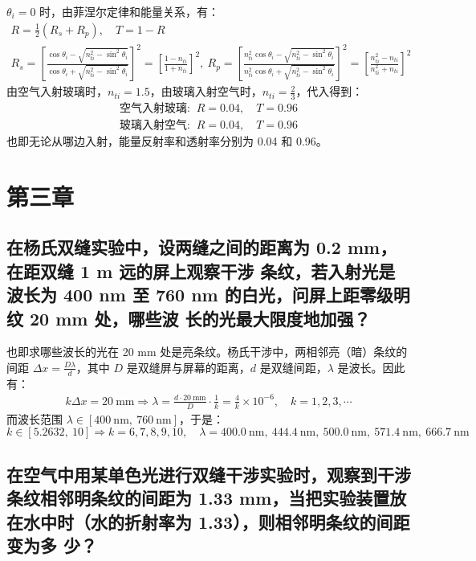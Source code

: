 \documentclass[UTF8]{report}
\theoremstyle{MyLineTheoremStyle} %
\theoremstyle{MyBlockTheoremStyle} %
\theoremstyle{MySubsubsectionStyle} %
\begin{document}
$\theta_i = 0$ 时，由菲涅尔定律和能量关系，有：
\begin{gather}
    R =  \frac{1}{2}(R_s + R_p),\quad  T = 1 - R\\ 
    R_s =  \left[ \frac{ \cos \theta_i - \sqrt{n_{ti}^2 - \sin^2 \theta_i} }{\cos \theta_i + \sqrt{n_{ti}^2 - \sin^2 \theta_i}} \right]^2 = \left[ \frac{1 - n_{ti}}{1 + n_{ti}} \right]^2,\ R_p = \left[ \frac{ n_{ti}^2\cos \theta_i - \sqrt{n_{ti}^2 - \sin^2 \theta_i} }{n_{ti}^2\cos \theta_i + \sqrt{n_{ti}^2 - \sin^2 \theta_i}} \right]^2 =  \left[ \frac{n_{ti}^2 - n_{ti}}{n_{ti}^2 + n_{ti}} \right]^2
\end{gather}
由空气入射玻璃时，$n_{ti} = 1.5$，由玻璃入射空气时，$n_{ti} = \frac{2}{3}$，代入得到：
\begin{gather*}
\text{空气入射玻璃: }\ R = 0.04,\quad  T = 0.96 \\ 
\text{玻璃入射空气: }\ R = 0.04,\quad  T = 0.96 
\end{gather*}
也即无论从哪边入射，能量反射率和透射率分别为 0.04 和 0.96。


\chapter{第三章}\thispagestyle{fancy}

\section{在杨氏双缝实验中，设两缝之间的距离为 0.2 mm，在距双缝 1 m 远的屏上观察干涉
条纹，若入射光是波长为 400 nm 至 760 nm 的白光，问屏上距零级明纹 20 mm 处，哪些波
长的光最大限度地加强？}

也即求哪些波长的光在 20 mm 处是亮条纹。杨氏干涉中，两相邻亮（暗）条纹的间距 $\Delta x = \frac{D \lambda}{d}$，其中 $D$ 是双缝屏与屏幕的距离，$d$ 是双缝间距，$\lambda$ 是波长。因此有：
\begin{gather}
k \Delta x = 20 \ \mathrm{mm} \Longrightarrow \lambda = \frac{d\cdot 20 \ \mathrm{mm}}{D} \cdot \frac{1 }{k} = \frac{4}{k}\times 10^{-6},\quad k = 1,2,3,\cdots
\end{gather}
而波长范围 $\lambda \in [400 \ \mathrm{nm} ,\ 760 \ \mathrm{nm}]$，于是：
\begin{equation}
k \in [5.2632,\ 10] \Longrightarrow k = 6,7,8,9,10 ,\quad \lambda = 400.0 \ \mathrm{nm},\ 444.4 \ \mathrm{nm},\ 500.0 \ \mathrm{nm},\ 571.4 \ \mathrm{nm},\ 666.7 \ \mathrm{nm}
\end{equation}

\section{在空气中用某单色光进行双缝干涉实验时，观察到干涉条纹相邻明条纹的间距为
1.33 mm，当把实验装置放在水中时（水的折射率为 1.33），则相邻明条纹的间距变为多
少？}
\end{document}
